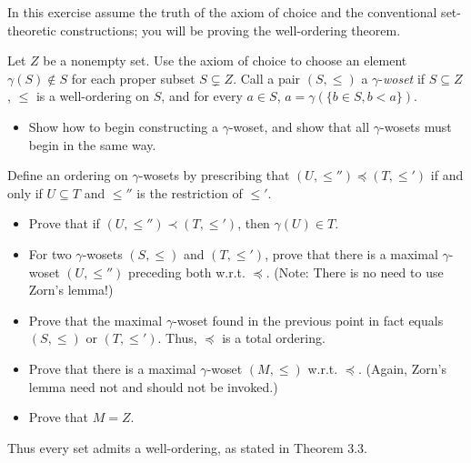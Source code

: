 \documentclass[../../master.tex]{subfiles}
\begin{document}
    \begin{problem}
        In this exercise assume the truth of the axiom of choice and the
        conventional set-theoretic constructions; you will be proving the
        well-ordering theorem.

        Let $Z$ be a nonempty set. Use the axiom of choice to choose an element
        $\gamma(S) \notin S$ for each proper subset $S \subsetneq Z$. Call a
        pair $(S, \leq)$ a $\gamma$-\textit{woset} if $S \subseteq Z$, $\leq$ is
        a well-ordering on $S$, and for every $a \in S$, $a = \gamma(\{b \in S,
        b < a\})$.
        \begin{itemize}
            \item Show how to begin constructing a $\gamma$-woset, and show that
                all $\gamma$-wosets must begin in the same way.
        \end{itemize}
        Define an ordering on $\gamma$-wosets by prescribing that $(U, \leq'')
        \preceq (T, \leq')$ if and only if $U \subseteq T$ and $\leq''$ is the
        restriction of $\leq'$.
        \begin{itemize}
            \item Prove that if $(U, \leq'') \prec (T, \leq')$, then $\gamma(U)
                \in T$.
            \item For two $\gamma$-wosets $(S, \leq)$ and $(T, \leq')$, prove
                that there is a maximal $\gamma$-woset $(U, \leq'')$ preceding
                both w.r.t. $\preceq$. (Note: There is no need to use Zorn's
                lemma!)
            \item Prove that the maximal $\gamma$-woset found in the previous
                point in fact equals $(S, \leq)$ or $(T, \leq')$. Thus,
                $\preceq$ is a total ordering.
            \item Prove that there is a maximal $\gamma$-woset $(M, \leq)$
                w.r.t. $\preceq$. (Again, Zorn's lemma need not and should not
                be invoked.)
            \item Prove that $M = Z$.
        \end{itemize}
        Thus every set admits a well-ordering, as stated in Theorem 3.3.
    \end{problem}
\end{document}
